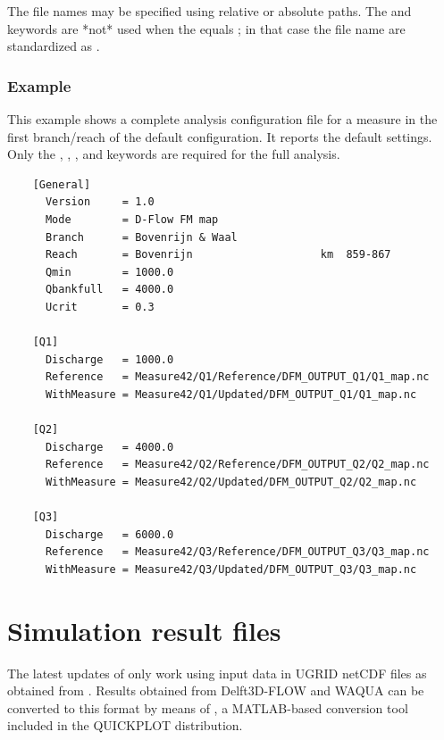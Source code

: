 The file names may be specified using relative or absolute paths.
The  and  keywords are *not* used when the  equals ; in that case the file name are standardized as .

\subsubsection*{Example}

This example shows a complete analysis configuration file for a measure in the first branch/reach of the default  configuration.
It reports the default settings.
Only the , , ,  and  keywords are required for the full analysis.

\begin{Verbatim}
    [General]
      Version     = 1.0
      Mode        = D-Flow FM map
      Branch      = Bovenrijn & Waal
      Reach       = Bovenrijn                    km  859-867
      Qmin        = 1000.0
      Qbankfull   = 4000.0
      Ucrit       = 0.3
    
    [Q1]
      Discharge   = 1000.0
      Reference   = Measure42/Q1/Reference/DFM_OUTPUT_Q1/Q1_map.nc
      WithMeasure = Measure42/Q1/Updated/DFM_OUTPUT_Q1/Q1_map.nc
    
    [Q2]
      Discharge   = 4000.0
      Reference   = Measure42/Q2/Reference/DFM_OUTPUT_Q2/Q2_map.nc
      WithMeasure = Measure42/Q2/Updated/DFM_OUTPUT_Q2/Q2_map.nc
    
    [Q3]
      Discharge   = 6000.0
      Reference   = Measure42/Q3/Reference/DFM_OUTPUT_Q3/Q3_map.nc
      WithMeasure = Measure42/Q3/Updated/DFM_OUTPUT_Q3/Q3_map.nc
\end{Verbatim}


\section{Simulation result files}

The latest updates of \dfastmi only work using input data in UGRID netCDF files as obtained from \dflowfm.
Results obtained from Delft3D-FLOW and WAQUA can be converted to this format by means of , a MATLAB-based conversion tool included in the QUICKPLOT distribution.

